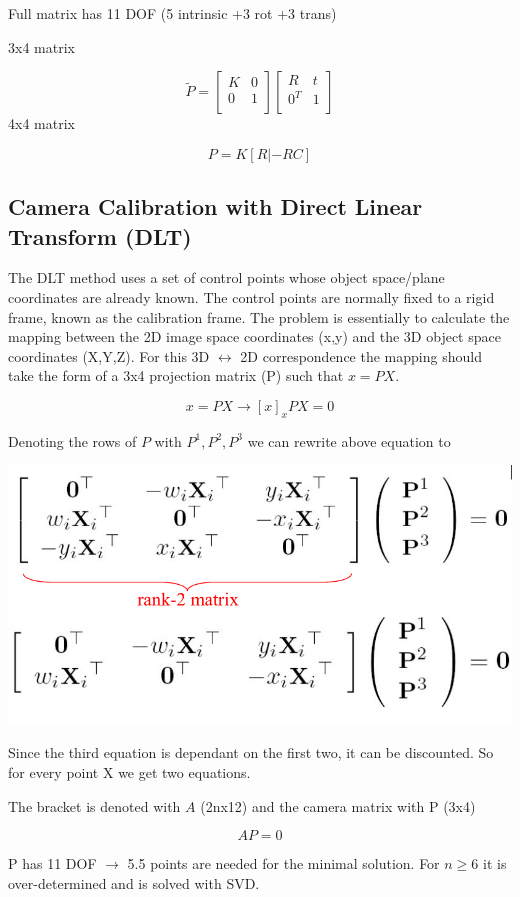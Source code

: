 Full matrix has 11 DOF (5 intrinsic +3 rot +3 trans)

3x4 matrix

$$ \tilde{P} = \begin{bmatrix}
K&0\\
0&1\\
\end{bmatrix} \begin{bmatrix}
R&t\\
0^T&1\\
\end{bmatrix} $$
4x4 matrix

$$P = K[R|-RC]$$

\subsection{Camera Calibration with Direct Linear Transform (DLT)}
The DLT method uses a set  of  control  points  whose  object  space/plane  coordinates  are  already  known.  The  control  points  are  normally  fixed  to  a  rigid  frame,  known  as  the  calibration  frame.    The  problem  is  essentially  to  calculate  the  mapping  between  the  2D  image  space  coordinates  (x,y)  and  the  3D  object  space  coordinates  (X,Y,Z).  For this 3D $\leftrightarrow$ 2D correspondence the mapping should take the form of a 3x4 projection matrix (P) such that $x = PX$.

$$ x = PX \rightarrow [x]_xPX = 0 $$

Denoting the rows of $P$ with $P^1, P^2, P^3$ we can rewrite above equation to

\includegraphics[width=0.7\columnwidth]{pictures/dlt}

Since the third equation is dependant on the first two, it can be discounted. So for every point X we get two equations.

The bracket is denoted with $A$ (2nx12) and the camera matrix with P (3x4)
  
$$ A P = 0 $$

P has 11 DOF $\rightarrow$ 5.5 points are needed for the minimal solution.
For $n \geq 6$ it is over-determined and is solved with SVD.

